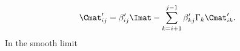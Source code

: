 \begin{equation}
\Cmat'_{ i j} = \beta_{i j}' \Imat  - \sum\limits^{j-1}_{k = i + 1} \beta'_{k j} \Gamma_k \Cmat'_{i k}.
\end{equation}
In the smooth limit